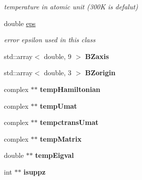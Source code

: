 \begin{DoxyCompactItemize}
\begin{DoxyCompactList}\small\item\em temperature in atomic unit (300K is defalut) \end{DoxyCompactList}\item 
\mbox{\label{class_tight_binding_a7bf81742449b6b9aac4b884ee094d129}} 
double \hyperlink{class_tight_binding_a7bf81742449b6b9aac4b884ee094d129}{eps}
\begin{DoxyCompactList}\small\item\em error epsilon used in this class \end{DoxyCompactList}\item 
\mbox{\label{class_tight_binding_a7a02226cd552a65fe842cf4f921d2f59}} 
std\+::array$<$ double, 9 $>$ {\bfseries B\+Zaxis}
\item 
\mbox{\label{class_tight_binding_add0327b9c4db10beb87eebb5aa718bd7}} 
std\+::array$<$ double, 3 $>$ {\bfseries B\+Zorigin}
\item 
\mbox{\label{class_tight_binding_a02ef2dcbfdfb3f9353a6ee84be47a506}} 
complex $\ast$$\ast$ {\bfseries temp\+Hamiltonian}
\item 
\mbox{\label{class_tight_binding_aa0bcd3f9896c8131f60f03bc0d0ac20b}} 
complex $\ast$$\ast$ {\bfseries temp\+Umat}
\item 
\mbox{\label{class_tight_binding_aaeff38a29484bb0e33701639097f3984}} 
complex $\ast$$\ast$ {\bfseries tempctrans\+Umat}
\item 
\mbox{\label{class_tight_binding_a8789784f059224143e82532eec99075e}} 
complex $\ast$$\ast$ {\bfseries temp\+Matrix}
\item 
\mbox{\label{class_tight_binding_a51935807bbebecce5bc3734ac2db6b78}} 
double $\ast$$\ast$ {\bfseries temp\+Eigval}
\item 
\mbox{\label{class_tight_binding_a2495a55c4e88c68e53d64d23b8a2ecf9}} 
int $\ast$$\ast$ {\bfseries isuppz}
\end{DoxyCompactItemize}


